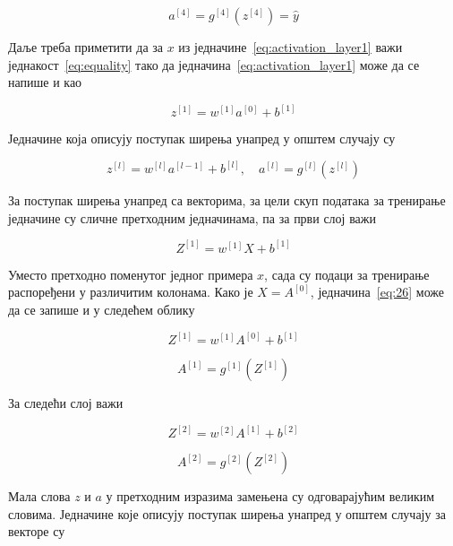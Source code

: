 \documentclass[master]{finthesis}
\begin{document}
\begin{equation}
a^{[4]} = g^{[4]}(z^{[4]}) = \hat{y}
\end{equation}

Даље треба приметити да за $x$ из једначине~\eqref{eq:activation_layer1} важи једнакост~\eqref{eq:equality} тако да једначина~\eqref{eq:activation_layer1} може да се напише и као

\begin{equation}
z^{[1]} = w^{[1]}a^{[0]} + b^{[1]}
\end{equation}

Једначине која описују поступак ширења унапред у општем случају су

\begin{equation}
z^{[l]} = w^{[l]}a^{[l-1]} + b^{[l]}, \quad a^{[l]} = g^{[l]}(z^{[l]})
\end{equation}

За поступак ширења унапред са векторима, за цели скуп података за тренирање једначине су сличне претходним једначинама, па за први слој важи

\begin{equation}
Z^{[1]} = w^{[1]}X + b^{[1]}
\label{eq:26}
\end{equation}

Уместо претходно поменутог једног примера $x$, сада су подаци за тренирање распоређени у различитим колонама. Како је $X=A^{[0]}$, једначина~\eqref{eq:26} може да се запише и у следећем облику

\begin{equation}
Z^{[1]} = w^{[1]}A^{[0]} + b^{[1]} 
\label{eq:Z1}
\end{equation}

\begin{equation}
A^{[1]} = g^{[1]}(Z^{[1]})
\label{eq:A1}
\end{equation}

За следећи слој важи 

\begin{equation}
Z^{[2]} = w^{[2]}A^{[1]} + b^{[2]} 
\label{eq:Z2}
\end{equation}

\begin{equation}
A^{[2]} = g^{[2]}(Z^{[2]})
\label{eq:A2}
\end{equation}


Мала слова $z$ и $a$ у претходним изразима замењена су одговарајућим великим словима. Једначине које описују поступак ширења унапред у општем случају за векторе су
\end{document}
